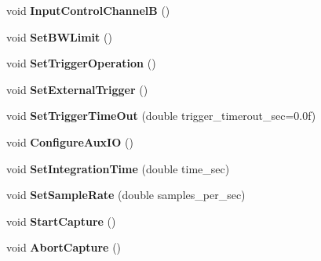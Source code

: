 \begin{DoxyCompactItemize}
\item 
void {\bfseries Input\+Control\+ChannelB} ()\hypertarget{classalazar_1_1_a_t_s9462_ab9879af3916cde958d9b93fd16211acc}{}\label{classalazar_1_1_a_t_s9462_ab9879af3916cde958d9b93fd16211acc}

\item 
void {\bfseries Set\+B\+W\+Limit} ()\hypertarget{classalazar_1_1_a_t_s9462_a5153f8e7f52791b42f9b1bbd736df07b}{}\label{classalazar_1_1_a_t_s9462_a5153f8e7f52791b42f9b1bbd736df07b}

\item 
void {\bfseries Set\+Trigger\+Operation} ()\hypertarget{classalazar_1_1_a_t_s9462_a84a882e5493371b9b57342fcc87d6ee2}{}\label{classalazar_1_1_a_t_s9462_a84a882e5493371b9b57342fcc87d6ee2}

\item 
void {\bfseries Set\+External\+Trigger} ()\hypertarget{classalazar_1_1_a_t_s9462_af0e0cfb35e881334d938e4855fe0076b}{}\label{classalazar_1_1_a_t_s9462_af0e0cfb35e881334d938e4855fe0076b}

\item 
void {\bfseries Set\+Trigger\+Time\+Out} (double trigger\+\_\+timerout\+\_\+sec=0.\+0f)\hypertarget{classalazar_1_1_a_t_s9462_a1072b3409870b3f41ed8ac43eb5bc45f}{}\label{classalazar_1_1_a_t_s9462_a1072b3409870b3f41ed8ac43eb5bc45f}

\item 
void {\bfseries Configure\+Aux\+IO} ()\hypertarget{classalazar_1_1_a_t_s9462_a677ccd33c37a38bc7a89e05af03248b8}{}\label{classalazar_1_1_a_t_s9462_a677ccd33c37a38bc7a89e05af03248b8}

\item 
void {\bfseries Set\+Integration\+Time} (double time\+\_\+sec)\hypertarget{classalazar_1_1_a_t_s9462_a772c256adaf6cbe6fde92ec85c69bf74}{}\label{classalazar_1_1_a_t_s9462_a772c256adaf6cbe6fde92ec85c69bf74}

\item 
void {\bfseries Set\+Sample\+Rate} (double samples\+\_\+per\+\_\+sec)\hypertarget{classalazar_1_1_a_t_s9462_a474ca0033e639f167d8fc0c19016ae38}{}\label{classalazar_1_1_a_t_s9462_a474ca0033e639f167d8fc0c19016ae38}

\item 
void {\bfseries Start\+Capture} ()\hypertarget{classalazar_1_1_a_t_s9462_a7efd31862655888e14aacaaed0bf7b66}{}\label{classalazar_1_1_a_t_s9462_a7efd31862655888e14aacaaed0bf7b66}

\item 
void {\bfseries Abort\+Capture} ()\hypertarget{classalazar_1_1_a_t_s9462_acea0e4b18a527d16eded70af1ebb32f2}{}\label{classalazar_1_1_a_t_s9462_acea0e4b18a527d16eded70af1ebb32f2}

\end{DoxyCompactItemize}
